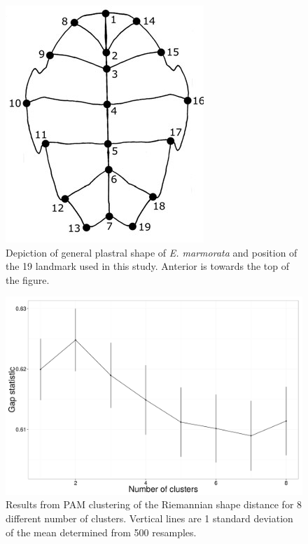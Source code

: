 \documentclass[12pt,letterpaper]{article}
\begin{document}
\begin{figure}[ht]
  \centering
  \includegraphics[height = \textheight, width = \textwidth, keepaspectratio = true]{figure/plastra}
  \caption{Depiction of general plastral shape of \textit{E. marmorata} and position of the 19 landmark used in this study. Anterior is towards the top of the figure.}
  \label{fig:plastra}
\end{figure}

\begin{figure}[ht]
  \centering
  \includegraphics[height = \textheight, width = \textwidth, keepaspectratio = true]{figure/gap_res}
  \caption{Results from PAM clustering of the Riemannian shape distance for 8 different number of clusters. Vertical lines are 1 standard deviation of the mean determined from 500 resamples.}
  \label{fig:gap}
\end{figure}
\end{document}

